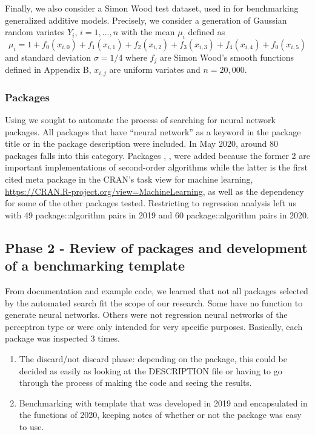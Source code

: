 Finally, we also consider a Simon Wood test dataset, used in
\citep{wood2011fast} for benchmarking generalized additive models.
Precisely, we consider a generation of Gaussian random variates \(Y_i\),
\(i=1,\dots,n\) with the mean \(\mu_i\) defined as \[
\mu_i = 1+ f_0(x_{i,0})+f_1(x_{i,1})+f_2(x_{i,2})+f_3(x_{i,3})
+f_4(x_{i,4})+f_0(x_{i,5})
\] and standard deviation \(\sigma=1/4\) where \(f_j\) are Simon Wood's
smooth functions defined in Appendix B, \(x_{i,j}\) are uniform variates
and \(n=20,000\).

\hypertarget{packages}{%
\subsubsection{Packages}\label{packages}}

Using  \citep{R-RWsearch} we sought to automate the
process of searching for neural network packages. All packages that have
``neural network'' as a keyword in the package title or in the package
description were included. In May 2020, around 80 packages falls into
this category. Packages , ,  were
added because the former 2 are important implementations of second-order
algorithms while the latter is the first cited meta package in the
CRAN's task view for machine learning,
\url{https://CRAN.R-project.org/view=MachineLearning}, as well as the
dependency for some of the other packages tested. Restricting to
regression analysis left us with 49 package::algorithm pairs in 2019 and
60 package::algorithm pairs in 2020.

\hypertarget{phase-2---review-of-packages-and-development-of-a-benchmarking-template}{%
\subsection{Phase 2 - Review of packages and development of a
benchmarking
template}\label{phase-2---review-of-packages-and-development-of-a-benchmarking-template}}

From documentation and example code, we learned that not all packages
selected by the automated search fit the scope of our research. Some
have no function to generate neural networks. Others were not regression
neural networks of the perceptron type or were only intended for very
specific purposes. Basically, each package was inspected 3 times.

\begin{enumerate}
\def\labelenumi{\arabic{enumi}.}
\item
  The discard/not discard phase: depending on the package, this could be
  decided as easily as looking at the DESCRIPTION file or having to go
  through the process of making the code and seeing the results.
\item
  Benchmarking with template that was developed in 2019 and encapsulated
  in the functions of 2020, keeping notes of whether or not the package
  was easy to use.
\end{enumerate}

